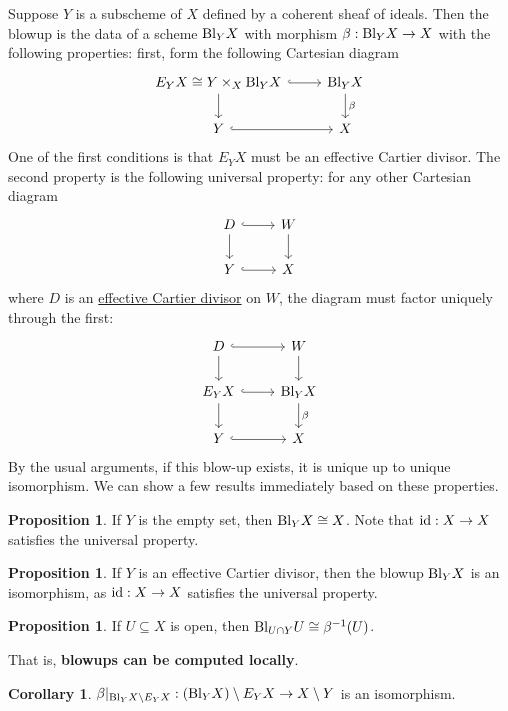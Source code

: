 \documentclass[10pt,reqno]{amsart}
\theoremstyle{definition}
\newtheorem{corollary}[theorem]{Corollary}
\newtheorem{proposition}[theorem]{Proposition}
\theoremstyle{remark}
\numberwithin{equation}{section}
\numberwithin{theorem}{section}
\newcommand{\Bl}{\textup{Bl}}
\begin{document}
Suppose $Y$ is a subscheme of $X$ defined by a coherent sheaf of ideals. Then the blowup is the data of a scheme $\Bl_Y X$ with morphism $\beta: \Bl_Y X \to X$ with the following properties: first, form the following Cartesian diagram
\[
\begin{tikzcd}
 E_Y X \cong Y \times_X \Bl_Y X  \arrow[r,hook] \arrow[d] & \Bl_Y X \arrow[d, "\beta"]\\
Y \arrow[r,hook] & X 
\end{tikzcd} 
\]
One of the first conditions is that $E_Y X$ must be an effective Cartier divisor. The second property is the following universal property: for any other Cartesian diagram
\[
\begin{tikzcd}
D \arrow[r, hook] \arrow[d] & W \arrow[d]\\
Y \arrow[r,hook] & X
\end{tikzcd}
\]
where $D$ is an \underline{effective Cartier divisor} on $W$, the diagram must factor uniquely through the first:
\[
\begin{tikzcd}
D \arrow[r, hook] \arrow[d] & W \arrow[d]\\
 E_Y X  \arrow[r,hook] \arrow[d] & \Bl_Y X \arrow[d, "\beta"]\\
Y \arrow[r,hook] & X 
\end{tikzcd}
\]
By the usual arguments, if this blow-up exists, it is unique up to unique isomorphism. We can show a few results immediately based on these properties.
\\

\begin{proposition} If $Y$ is the empty set, then $\Bl_Y X \cong X$. Note that $\textup{id}: X \to X$ satisfies the universal property.
\end{proposition}

\begin{proposition} If $Y$ is an effective Cartier divisor, then the blowup $\Bl_Y X$ is an isomorphism, as $\textup{id}: X \to X$ satisfies the universal property.
\end{proposition}

\begin{proposition} If $U \subseteq X$ is open, then $\Bl_{U \cap Y} U \cong \beta^{-1}(U)$.
\end{proposition}
That is, \textbf{blowups can be computed locally}.

\begin{corollary} $\beta|_{\Bl_Y X \setminus E_Y X}: (\Bl_Y X) \setminus E_Y X \to X \setminus Y$ is an isomorphism.
\end{corollary}
\end{document}
